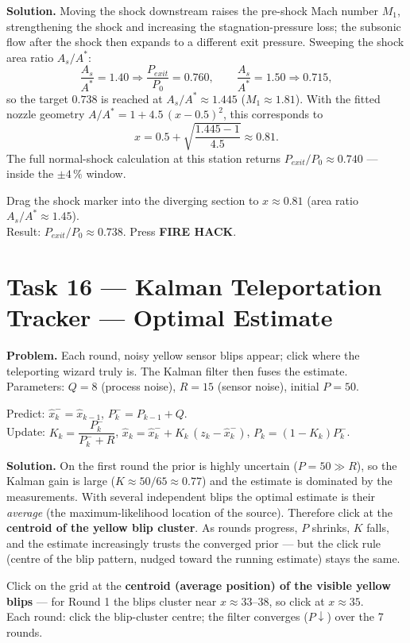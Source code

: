 \documentclass[11pt]{article}
\newcommand{\task}[2]{\section{Task #1 --- #2}}
\begin{document}
\textbf{Solution.} Moving the shock downstream raises the pre-shock Mach number
$M_1$, strengthening the shock and increasing the stagnation-pressure loss; the
subsonic flow after the shock then expands to a different exit pressure.
Sweeping the shock area ratio $A_s/A^{*}$:
\[
\frac{A_s}{A^{*}}=1.40\Rightarrow\frac{P_{exit}}{P_0}=0.760,\qquad
\frac{A_s}{A^{*}}=1.50\Rightarrow0.715,
\]
so the target $0.738$ is reached at $A_s/A^{*}\approx1.445$
($M_1\approx1.81$). With the fitted nozzle geometry
$A/A^{*}=1+4.5\,(x-0.5)^2$, this corresponds to
\[
x=0.5+\sqrt{\frac{1.445-1}{4.5}}\approx0.81 .
\]
The full normal-shock calculation at this station returns
$P_{exit}/P_0\approx0.740$ --- inside the $\pm4\,\%$ window.

\begin{answer}
Drag the shock marker into the diverging section to \textbf{$x\approx0.81$}
(area ratio $A_s/A^{*}\approx1.45$).\\
Result: $P_{exit}/P_0\approx0.738$. Press \textbf{FIRE HACK}.
\end{answer}

\task{16}{Kalman Teleportation Tracker --- Optimal Estimate}
\textbf{Problem.} Each round, noisy yellow sensor blips appear; click where the
teleporting wizard truly is. The Kalman filter then fuses the estimate.
Parameters: $Q=8$ (process noise), $R=15$ (sensor noise), initial $P=50$.

\begin{relbox}
Predict: $\hat x_k^-=\hat x_{k-1}$, $P_k^-=P_{k-1}+Q$.\\
Update: $K_k=\dfrac{P_k^-}{P_k^-+R}$,\;\;
$\hat x_k=\hat x_k^-+K_k\,(z_k-\hat x_k^-)$,\;\;
$P_k=(1-K_k)P_k^-$.
\end{relbox}

\textbf{Solution.} On the first round the prior is highly uncertain
($P=50\gg R$), so the Kalman gain is large ($K\approx50/65\approx0.77$) and the
estimate is dominated by the measurements. With several independent blips the
optimal estimate is their \emph{average} (the maximum-likelihood location of
the source). Therefore click at the \textbf{centroid of the yellow blip
cluster}. As rounds progress, $P$ shrinks, $K$ falls, and the estimate
increasingly trusts the converged prior --- but the click rule (centre of the
blip pattern, nudged toward the running estimate) stays the same.

\begin{answer}
Click on the grid at the \textbf{centroid (average position) of the visible
yellow blips} --- for Round 1 the blips cluster near $x\approx33$--$38$, so
click at \textbf{$x\approx35$}.\\
Each round: click the blip-cluster centre; the filter converges ($P\downarrow$)
over the 7 rounds.
\end{answer}
\end{document}
